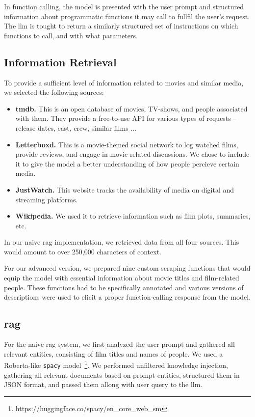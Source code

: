 \documentclass[fleqn,moreauthors,10pt]{ds_report}
\begin{document}
In function calling, the model is presented with the user prompt and structured information about programmatic functions it may call to fullfil the user's request. The \ac{llm} is tought to return a similarly structured set of instructions on which functions to call, and with what parameters.

\subsection*{Information Retrieval}

To provide a sufficient level of information related to movies and similar media, we selected the following sources:

\begin{itemize}
	\item \textbf{\ac{tmdb}.} This is an open database of movies, TV-shows, and people associated with them. They provide a free-to-use API for various types of requests -- release dates, cast, crew, similar films ...
	\item \textbf{Letterboxd.} This is a movie-themed social network to log watched films, provide reviews, and engage in movie-related discussions. We chose to include it to give the model a better understanding of how people percieve certain media.
	\item \textbf{JustWatch.} This website tracks the availability of media on digital and streaming platforms.
	\item \textbf{Wikipedia.} We used it to retrieve information such as film plots, summaries, etc.
\end{itemize}

In our naive \ac{rag} implementation, we retrieved data from all four sources. This would amount to over 250,000 characters of context.

For our advanced version, we prepared nine custom scraping functions that would equip the model with essential information about movie titles and film-related people. These functions had to be specifically annotated and various versions of descriptions were used to elicit a proper function-calling response from the model.

\subsection*{\ac{rag}}

For the naive \ac{rag} system, we first analyzed the user prompt and gathered all relevant entities, consisting of film titles and names of people. We used a Roberta-like \texttt{spacy} model~\footnote{https://huggingface.co/spacy/en\_core\_web\_sm}. We performed unfiltered knowledge injection, gathering all relevant documents based on prompt entities, structured them in JSON format, and passed them allong with user query to the \ac{llm}.
\end{document}
